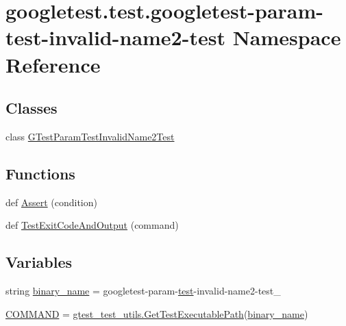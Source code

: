 \hypertarget{namespacegoogletest_1_1test_1_1googletest-param-test-invalid-name2-test}{}\section{googletest.\+test.\+googletest-\/param-\/test-\/invalid-\/name2-\/test Namespace Reference}
\label{namespacegoogletest_1_1test_1_1googletest-param-test-invalid-name2-test}
\subsection*{Classes}
\begin{DoxyCompactItemize}
\item 
class \mbox{\hyperlink{classgoogletest_1_1test_1_1googletest-param-test-invalid-name2-test_1_1_g_test_param_test_invalid_name2_test}{G\+Test\+Param\+Test\+Invalid\+Name2\+Test}}
\end{DoxyCompactItemize}
\subsection*{Functions}
\begin{DoxyCompactItemize}
\item 
def \mbox{\hyperlink{namespacegoogletest_1_1test_1_1googletest-param-test-invalid-name2-test_a140cf6bca2f100cb1e8802e8f4d45a8c}{Assert}} (condition)
\item 
def \mbox{\hyperlink{namespacegoogletest_1_1test_1_1googletest-param-test-invalid-name2-test_ad8f3b058f74f560dea596b54980287b6}{Test\+Exit\+Code\+And\+Output}} (command)
\end{DoxyCompactItemize}
\subsection*{Variables}
\begin{DoxyCompactItemize}
\item 
string \mbox{\hyperlink{namespacegoogletest_1_1test_1_1googletest-param-test-invalid-name2-test_a6aa273d4cc203f6cfc58d59bcfc9e8fe}{binary\+\_\+name}} = \textquotesingle{}googletest-\/param-\/\mbox{\hyperlink{_mutual_8h_a707ee03719e99670bf6cfdfd897b8456}{test}}-\/invalid-\/name2-\/test\+\_\+\textquotesingle{}
\item 
\mbox{\hyperlink{namespacegoogletest_1_1test_1_1googletest-param-test-invalid-name2-test_ab2f615cfc990c800a7be1b423698d0ea}{C\+O\+M\+M\+A\+ND}} = \mbox{\hyperlink{namespacegoogletest_1_1test_1_1gtest__test__utils_ac9af888c702350aac56b154a6af34098}{gtest\+\_\+test\+\_\+utils.\+Get\+Test\+Executable\+Path}}(\mbox{\hyperlink{namespacegoogletest_1_1test_1_1googletest-param-test-invalid-name2-test_a6aa273d4cc203f6cfc58d59bcfc9e8fe}{binary\+\_\+name}})
\end{DoxyCompactItemize}



